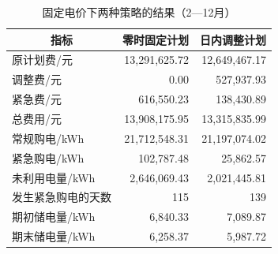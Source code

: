 \par
\begin{table}[!htbp]
\centering
\caption{固定电价下两种策略的结果（2—12月）}\label{tab:q3-comparison}
\normalsize
\begin{tabular}{lrr}
\toprule
\multicolumn{1}{c}{指标} & \multicolumn{1}{c}{零时固定计划} & \multicolumn{1}{c}{日内调整计划} \\
\midrule
原计划费/元 & 13,291,625.72 & 12,649,467.17 \\
调整费/元 & 0.00 & 527,937.93 \\
紧急费/元 & 616,550.23 & 138,430.89 \\
总费用/元 & 13,908,175.95 & 13,315,835.99 \\
常规购电/kWh & 21,712,548.31 & 21,197,074.02 \\
紧急购电/kWh & 102,787.48 & 25,862.57 \\
未利用电量/kWh & 2,646,069.43 & 2,021,445.81 \\
发生紧急购电的天数 & 115 & 139 \\
期初储电量/kWh & 6,840.33 & 7,089.87 \\
期末储电量/kWh & 6,258.37 & 5,987.72 \\
\bottomrule
\end{tabular}
\end{table}
\par
